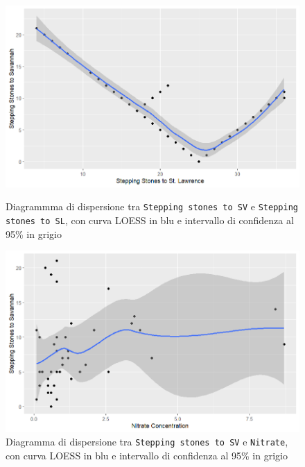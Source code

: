 \documentclass{article} %
\begin{document}
\begin{figure}[H]
    \centering
    \begin{minipage}{0.49\textwidth}
        \centering
        \includegraphics[width=\textwidth]{immagini/sv_sl.png}
        \captionsetup{justification=centering}
        \caption{Diagrammma di dispersione tra \texttt{Stepping stones to SV} e \texttt{Stepping stones to SL}, con curva LOESS in blu e intervallo di confidenza al 95\% in grigio}
    \end{minipage}
    \hfill
    \begin{minipage}{0.49\textwidth}
        \centering
        \includegraphics[width=\textwidth]{immagini/sv_nitrate.png}
        \captionsetup{justification=centering}
        \caption{Diagramma di dispersione tra \texttt{Stepping stones to SV} e \texttt{Nitrate}, con curva LOESS in blu e intervallo di confidenza al 95\% in grigio}
    \end{minipage}
\end{figure}
\end{document}

